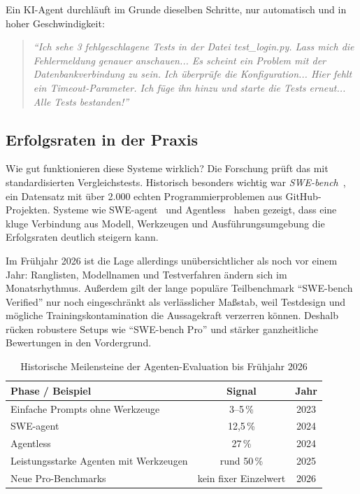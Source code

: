 Ein KI-Agent durchläuft im Grunde dieselben Schritte, nur automatisch und in hoher Geschwindigkeit:

\begin{quote}
\textit{\enquote{Ich sehe 3 fehlgeschlagene Tests in der Datei test\_login.py. Lass mich die Fehlermeldung genauer anschauen... Es scheint ein Problem mit der Datenbankverbindung zu sein. Ich überprüfe die Konfiguration... Hier fehlt ein Timeout-Parameter. Ich füge ihn hinzu und starte die Tests erneut... Alle Tests bestanden!}}
\end{quote}

\subsection{Erfolgsraten in der Praxis}

Wie gut funktionieren diese Systeme wirklich? Die Forschung prüft das mit standardisierten Vergleichstests. Historisch besonders wichtig war \emph{SWE-bench}~\cite{jimenez2023swe}, ein Datensatz mit über 2.000 echten Programmierproblemen aus GitHub-Projekten. Systeme wie SWE-agent~\cite{yang2024sweagent} und Agentless~\cite{zhang2024agentless} haben gezeigt, dass eine kluge Verbindung aus Modell, Werkzeugen und Ausführungsumgebung die Erfolgsraten deutlich steigern kann.

Im Frühjahr 2026 ist die Lage allerdings unübersichtlicher als noch vor einem Jahr: Ranglisten, Modellnamen und Testverfahren ändern sich im Monatsrhythmus. Außerdem gilt der lange populäre Teilbenchmark \enquote{SWE-bench Verified} nur noch eingeschränkt als verlässlicher Maßstab, weil Testdesign und mögliche Trainingskontamination die Aussagekraft verzerren können. Deshalb rücken robustere Setups wie \enquote{SWE-bench Pro} und stärker ganzheitliche Bewertungen in den Vordergrund.~\cite{openai2026swebenchverified,swebench2026leaderboard}

\begin{table}[ht]
\centering
\small
\begin{tabularx}{\columnwidth}{@{}Y c c@{}}
\toprule
\textbf{Phase / Beispiel} & \textbf{Signal} & \textbf{Jahr} \\
\midrule
Einfache Prompts ohne Werkzeuge & 3--5\,\% & 2023 \\
SWE-agent & 12,5\,\% & 2024 \\
Agentless & 27\,\% & 2024 \\
Leistungsstarke Agenten mit Werkzeugen & rund 50\,\% & 2025 \\
Neue Pro-Benchmarks & kein fixer Einzelwert & 2026 \\
\bottomrule
\end{tabularx}
\caption{Historische Meilensteine der Agenten-Evaluation bis Frühjahr 2026}
\label{tab:benchmark}
\end{table}

